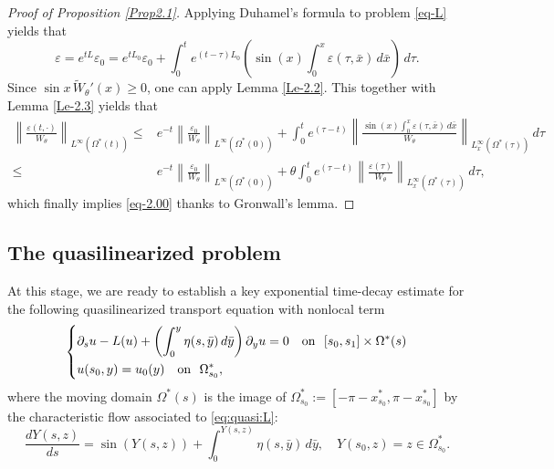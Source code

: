 \documentclass[12pt]{amsart}
\numberwithin{equation}{section}
\let\veps=\varepsilon
\numberwithin{equation}{section}
\begin{document}
\begin{proof}[Proof of Proposition \ref{Prop2.1}]

Applying Duhamel's formula to   problem  \eqref{eq-L} yields that
 \begin{equation}\label{ }
\veps = e^{tL} \veps_0 =  e^{tL_0} \veps_0 +\int_0^t e^{(t-\tau)L_0}\left(\sin(x)\int_0^x\veps(\tau, \bar x)\,d\bar x\right) \,d\tau.
\end{equation}
Since $\sin x \,\widetilde{W}_{\theta}'(x)\geq0$, one can apply   Lemma \ref{Le-2.2}.  This together with Lemma \ref{Le-2.3}  yields  that
  \begin{align*}
 \left \|\frac{ \veps(t, \cdot)}{W_\theta}\right\|_{L^\infty(\Omega^*(t))}  \leq& e^{-t} \left\|\frac{\veps_0}{W_\theta} \right\|_{L^\infty(\Omega^*(0))}+\int_0^t e^{(\tau-t)} \left \|\frac{\sin(x)\int_0^x \veps(\tau, \bar x)\,d\bar x}{W_\theta}\right\|_{L_x^\infty(\Omega^*(\tau))}\,d\tau\\
\leq&  e^{-t} \left \|  \frac{\veps_0}{W_\theta}\right\|_{L^\infty(\Omega^*(0))}+\theta \int_0^t e^{(\tau-t)} \left\|\frac{\veps (\tau)}{W_\theta}\right\|_{L_x^\infty(\Omega^*(\tau))}\,d\tau,
\end{align*}
which finally  implies \eqref{eq-2.00} thanks to Gronwall's lemma.   
 \end{proof}
 
 \bigbreak
 
 \subsection{The quasilinearized problem}\label{subsec.quasilin}
 At this stage,  we are ready to establish  a key  exponential time-decay estimate for  the following quasilinearized transport equation with nonlocal term
\begin{equation}\label{eq:quasi:L}
\left\{\begin{aligned} 
&\partial_s u - L (u) + \left(\int_{0}^y \eta(s,\bar y) \,d\bar y\right) \partial_y u =0\quad{\rm on}~~ [s_0,s_1]\times \Omega^*(s)\\
&u(s_0, y)=u_0(y)\quad{\rm on}~~   \Omega^*_{s_0},
\end{aligned}\right.
\end{equation}
where  the moving domain $\Omega^*(s)$ is the image of $\Omega^*_{s_0}:=[-\pi -x^*_{s_0}, \pi-x^*_{s_0}]$ by the characteristic flow associated to \eqref{eq:quasi:L}:
 \begin{equation}\label{Flow2}
\frac{d Y(s, z)}{ds}=\sin(Y(s,  z)) +\int_0^{Y(s, z)} \eta(s, \bar y)\, d\bar y,\quad Y(s_0, z)=z\in \Omega^*_{s_0}.
\end{equation}
\end{document}
